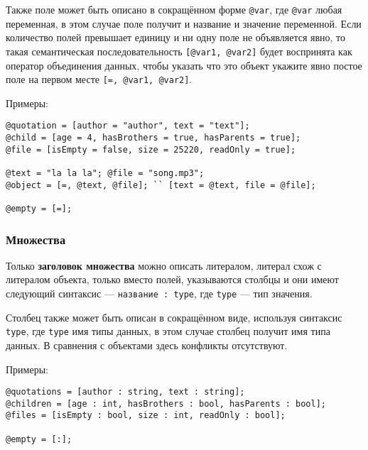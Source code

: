 Также поле может быть описано в сокращённом форме \texttt{@var}, где \texttt{@var} любая переменная, в этом случае поле получит и название и значение переменной. Если количество полей превышает единицу и ни одну поле не объявляется явно, то такая семантическая последовательность \texttt{[@var1, @var2]} будет воспринята как оператор объединения данных, чтобы указать что это объект укажите явно постое поле на первом месте \texttt{[=, @var1, @var2]}.

\noindent Примеры:
\begin{verbatim}
@quotation = [author = "author", text = "text"];
@child = [age = 4, hasBrothers = true, hasParents = true];
@file = [isEmpty = false, size = 25220, readOnly = true];

@text = "la la la"; @file = "song.mp3";
@object = [=, @text, @file]; `` [text = @text, file = @file];

@empty = [=];
\end{verbatim}

\subsubsection{Множества}

Только {\bf заголовок множества} можно описать литералом, литерал схож с литералом объекта, только вместо полей, указываются столбцы и они имеют следующий синтаксис — \texttt{название : type}, где \texttt{type} — тип значения.

Столбец также может быть описан в сокращённом виде, используя синтаксис \texttt{type}, где \texttt{type} имя типы данных, в этом случае столбец получит имя типа данных. В сравнения с объектами здесь конфликты отсутствуют.

\noindent Примеры:
\begin{verbatim}
@quotations = [author : string, text : string];
@children = [age : int, hasBrothers : bool, hasParents : bool];
@files = [isEmpty : bool, size : int, readOnly : bool];

@empty = [:];
\end{verbatim}

